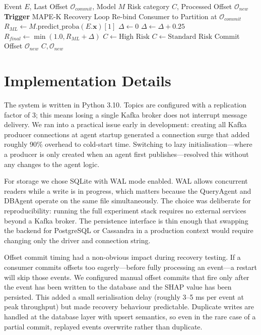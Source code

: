 \documentclass[runningheads]{llncs}
\begin{document}
\begin{algorithm}[H]
\caption{Self-Healing Adaptive Pipeline Execution}
\begin{algorithmic}[1]
\REQUIRE Event $E$, Last Offset $\mathcal{O}_{commit}$, Model $M$
\ENSURE Risk category $C$, Processed Offset $\mathcal{O}_{new}$
    \STATE \textbf{Trigger} MAPE-K Recovery Loop
    \STATE Re-bind Consumer to Partition at $\mathcal{O}_{commit}$
\ENDIF
\STATE $R_{ML} \leftarrow M.\text{predict\_proba}(E.\mathbf{x})[1]$
\STATE $\Delta \leftarrow 0$
    \STATE $\Delta \leftarrow \Delta + 0.25$
\ENDIF
\STATE $R_{final} \leftarrow \min(1.0, R_{ML} + \Delta)$
    \STATE $C \leftarrow \text{High Risk}$
\ELSE
    \STATE $C \leftarrow \text{Standard Risk}$
\ENDIF
\STATE Commit Offset $\mathcal{O}_{new}$
\RETURN $C, \mathcal{O}_{new}$
\end{algorithmic}
\end{algorithm}

\section{Implementation Details}

The system is written in Python 3.10. Topics are configured with a replication factor of 3; this means losing a single Kafka broker does not interrupt message delivery. We ran into a practical issue early in development: creating all Kafka producer connections at agent startup generated a connection surge that added roughly 90\% overhead to cold-start time. Switching to lazy initialisation---where a producer is only created when an agent first publishes---resolved this without any changes to the agent logic.

For storage we chose SQLite with WAL mode enabled. WAL allows concurrent readers while a write is in progress, which matters because the QueryAgent and DBAgent operate on the same file simultaneously. The choice was deliberate for reproducibility: running the full experiment stack requires no external services beyond a Kafka broker. The persistence interface is thin enough that swapping the backend for PostgreSQL or Cassandra in a production context would require changing only the driver and connection string.

Offset commit timing had a non-obvious impact during recovery testing. If a consumer commits offsets too eagerly---before fully processing an event---a restart will skip those events. We configured manual offset commits that fire only after the event has been written to the database and the SHAP value has been persisted. This added a small serialisation delay (roughly 3--5 ms per event at peak throughput) but made recovery behaviour predictable. Duplicate writes are handled at the database layer with upsert semantics, so even in the rare case of a partial commit, replayed events overwrite rather than duplicate.
\end{document}
